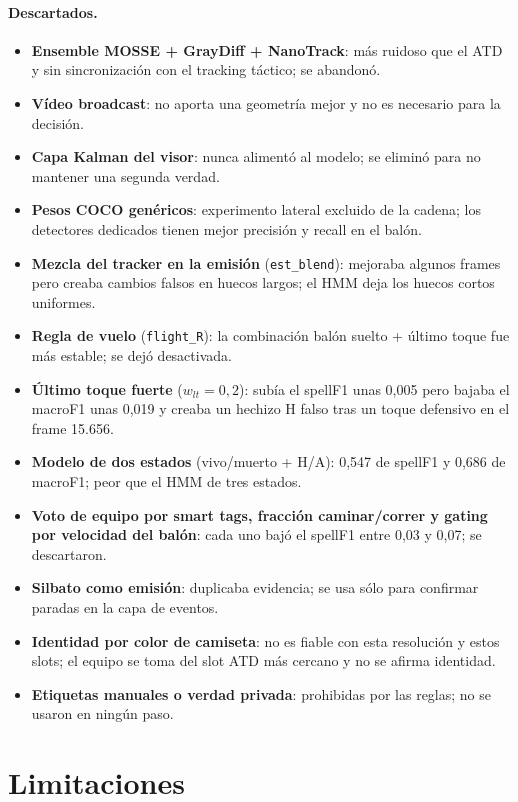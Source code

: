 \documentclass[10pt,a4paper]{article}
\newcommand{\code}[1]{\texttt{\small #1}}
\begin{document}
\paragraph{Descartados.}
\begin{itemize}
\item \textbf{Ensemble MOSSE + GrayDiff + NanoTrack}: más ruidoso que el ATD y sin sincronización
con el tracking táctico; se abandonó.
\item \textbf{Vídeo broadcast}: no aporta una geometría mejor y no es necesario para la decisión.
\item \textbf{Capa Kalman del visor}: nunca alimentó al modelo; se eliminó para no mantener una
segunda verdad.
\item \textbf{Pesos COCO genéricos}: experimento lateral excluido de la cadena; los detectores
dedicados tienen mejor precisión y recall en el balón.
\item \textbf{Mezcla del tracker en la emisión} (\code{est\_blend}): mejoraba algunos frames pero
creaba cambios falsos en huecos largos; el HMM deja los huecos cortos uniformes.
\item \textbf{Regla de vuelo} (\code{flight\_R}): la combinación balón suelto + último toque fue
más estable; se dejó desactivada.
\item \textbf{Último toque fuerte} ($w_{lt}=0{,}2$): subía el spellF1 unas 0,005 pero bajaba el
macroF1 unas 0,019 y creaba un hechizo H falso tras un toque defensivo en el frame 15.656.
\item \textbf{Modelo de dos estados} (vivo/muerto + H/A): 0,547 de spellF1 y 0,686 de macroF1;
peor que el HMM de tres estados.
\item \textbf{Voto de equipo por smart tags, fracción caminar/correr y gating por velocidad del
balón}: cada uno bajó el spellF1 entre 0,03 y 0,07; se descartaron.
\item \textbf{Silbato como emisión}: duplicaba evidencia; se usa sólo para confirmar paradas en la
capa de eventos.
\item \textbf{Identidad por color de camiseta}: no es fiable con esta resolución y estos slots; el
equipo se toma del slot ATD más cercano y no se afirma identidad.
\item \textbf{Etiquetas manuales o verdad privada}: prohibidas por las reglas; no se usaron en
ningún paso.
\end{itemize}

\section{Limitaciones}
\end{document}
